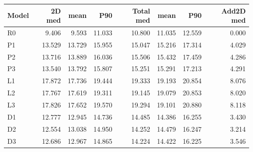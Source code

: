 \begin{longtable}{lrrrrrrr}\toprule Model & 2D med & mean & P90 & Total med & mean & P90 & Add2D med\\\midrule\endhead
R0 & 9.406 & 9.593 & 11.033 & 10.800 & 11.035 & 12.559 & 0.000 \\
P1 & 13.529 & 13.729 & 15.955 & 15.047 & 15.216 & 17.314 & 4.029 \\
P2 & 13.716 & 13.889 & 16.036 & 15.506 & 15.432 & 17.459 & 4.286 \\
P3 & 13.540 & 13.792 & 15.807 & 15.251 & 15.291 & 17.213 & 4.291 \\
L1 & 17.872 & 17.736 & 19.444 & 19.333 & 19.193 & 20.854 & 8.076 \\
L2 & 17.767 & 17.619 & 19.311 & 19.145 & 19.079 & 20.853 & 8.020 \\
L3 & 17.826 & 17.652 & 19.570 & 19.294 & 19.101 & 20.880 & 8.118 \\
D1 & 12.777 & 12.945 & 14.736 & 14.485 & 14.386 & 16.255 & 3.430 \\
D2 & 12.554 & 13.038 & 14.950 & 14.252 & 14.479 & 16.247 & 3.214 \\
D3 & 12.686 & 12.967 & 14.865 & 14.224 & 14.422 & 16.225 & 3.546 \\
\bottomrule\end{longtable}
